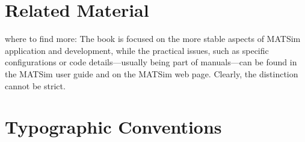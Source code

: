 \section*{Related Material}

where to find more:
The book is focused on the more stable aspects of MATSim application and development, while the practical issues, such as specific configurations or code details---usually being part of manuals---can be found in the MATSim user guide \citep[][]{MATSim_Userguide_2014} and on the MATSim web page. Clearly, the distinction cannot be strict.

\section*{Typographic Conventions}

